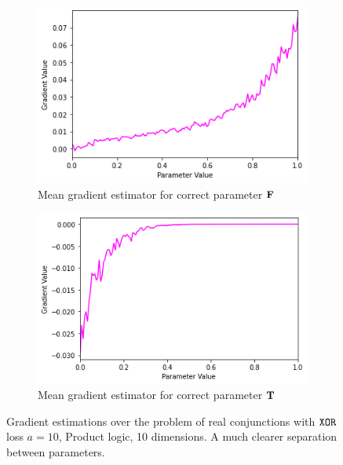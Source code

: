 \begin{figure}[ht]
\begin{subfigure}[b]{0.47\textwidth}
        \includegraphics[width=\textwidth]{imgs/grad_prod_10_falseparam_avg.png}
        \caption{Mean gradient estimator for correct parameter $\textbf{F}$}
        \label{fig:conjgrad10falseavg}
    \end{subfigure}
    \begin{subfigure}[b]{0.47\textwidth}
        \centering
        \includegraphics[width=\textwidth]{imgs/grad_prod_10_trueparam_avg.png}
        \caption{Mean gradient estimator for correct parameter $\textbf{T}$}
        \label{fig:conjgrad10trueavg}
    \end{subfigure}
       \caption{Gradient estimations over the problem of real conjunctions with $\texttt{XOR}$ loss $a=10$, Product logic, 10 dimensions. A much clearer separation between parameters.}
       \label{fig:conjgrad10}
\end{figure}


